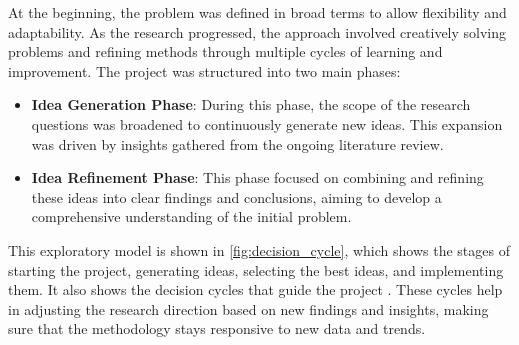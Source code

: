 \noindent
At the beginning, the problem was defined in broad terms to allow flexibility and adaptability. As the research progressed,  the approach involved creatively solving problems and refining methods through multiple cycles of learning and improvement. The project was structured into two main phases: \par
\begin{itemize}
    \item \textbf{Idea Generation Phase}:  During this phase, the scope of the research questions was broadened to continuously generate new ideas. This expansion was driven by insights gathered from the ongoing literature review.
    \item \textbf{Idea Refinement Phase}: This phase focused on combining and refining these ideas into clear findings and conclusions, aiming to develop a comprehensive understanding of the initial problem.
\end{itemize}
\noindent
This exploratory model is shown in \autoref{fig:decision_cycle}, which shows the stages of starting the project, generating ideas, selecting the best ideas, and implementing them. It also shows the decision cycles that guide the project \autocite{DesignThinking}. These cycles help in adjusting the research direction based on new findings and insights, making sure that the methodology stays responsive to new data and trends. \par 

